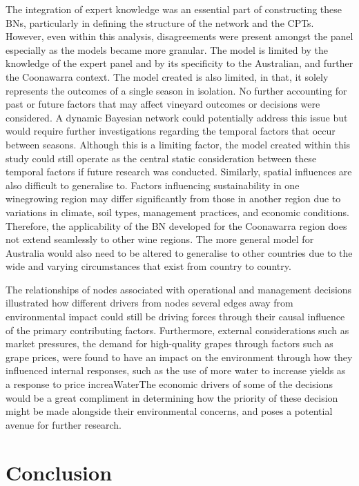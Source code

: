\documentclass[10pt,letterpaper]{article}
\begin{document}
The integration of expert knowledge was an essential part of constructing these BNs, particularly in defining the structure of the network and the CPTs. However, even within this analysis, disagreements were present amongst the panel especially as the models became more granular. The model is limited by the knowledge of the expert panel and by its specificity to the Australian, and further the Coonawarra context. The model created is also limited, in that, it solely represents the outcomes of a single season in isolation. No further accounting for past or future factors that may affect vineyard outcomes or decisions were considered. A dynamic Bayesian network could potentially address this issue but would require further investigations regarding the temporal factors that occur between seasons. Although this is a limiting factor, the model created within this study could still operate as the central static consideration between these temporal factors if future research was conducted. Similarly, spatial influences are also difficult to generalise to. Factors influencing sustainability in one winegrowing region may differ significantly from those in another region due to variations in climate, soil types, management practices, and economic conditions. Therefore, the applicability of the BN developed for the Coonawarra region does not extend seamlessly to other wine regions. The more general model for Australia would also need to be altered to generalise to other countries due to the wide and varying circumstances that exist from country to country.

The relationships of nodes associated with operational and management  decisions illustrated how different drivers from nodes several edges away from environmental impact could still be driving forces through their causal influence of the primary contributing factors. Furthermore, external considerations such as market pressures, the demand for high-quality grapes through factors such as grape prices, were found to have an impact on the environment through how they influenced internal responses, such as the use of more water to increase yields as a response to price increaWaterThe economic drivers of some of the decisions would be a great compliment in determining how the priority of these decision might be made alongside their environmental concerns, and poses a potential avenue for further research.

\section*{Conclusion}
\end{document}
